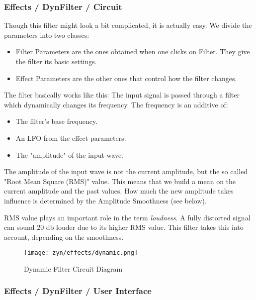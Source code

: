 \subsubsection{Effects / DynFilter / Circuit}
\label{subsubsec:effects_edit_dynfilter_circuit}

   Though this filter might look a bit complicated, it is actually easy. We
   divide the parameters into two classes:

   \begin{itemize}
      \item Filter Parameters are the ones obtained when one clicks on Filter.
         They give the filter its basic settings.
      \item Effect Parameters are the other ones that control how the filter
         changes.
   \end{itemize}

   The filter basically works like this: The input signal is passed through a
   filter which dynamically changes its frequency. The frequency is an
   additive of:

   \begin{itemize}
      \item The filter’s base frequency.
      \item An LFO from the effect parameters.
      \item The "amplitude" of the input wave.
   \end{itemize}

   The amplitude of the input wave is not the current amplitude, but the so
   called "Root Mean Square (RMS)" value. This means that we build a mean on
   the current amplitude and the past values. How much the new amplitude
   takes influence is determined by the Amplitude Smoothness (see below).

   RMS value plays an important role in the term \textsl{loudness}.
   A fully distorted signal can sound 20 db louder due to its higher RMS value.
   This filter takes this into account, depending on the smoothness.

\begin{figure}[H]
   \centering
   \texttt{[image: zyn/effects/dynamic.png]}
   \caption{Dynamic Filter Circuit Diagram}
   \label{fig:dynfilter_circuit_diagram}
\end{figure}

\subsubsection{Effects / DynFilter / User Interface}
\label{subsubsec:effects_edit_dynfilter_ui}

